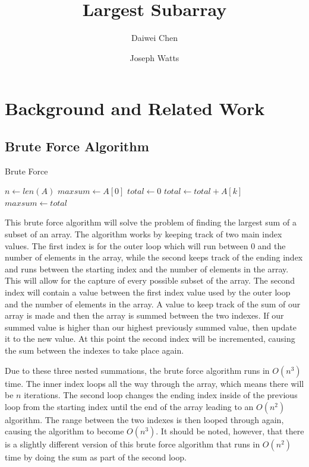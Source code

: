 \documentclass[10pt, letterpaper]{article}
\title{Largest Subarray}
\author{Daiwei Chen \and Joseph Watts}
\begin{document}
	\maketitle
	\begin{abstract}

	\end{abstract}
	\section{Background and Related Work}

	\subsection{Brute Force Algorithm}

	\begin{algorithm}
	\begin{algorithmic}
		\caption{Brute Force}\label{bruteforce}
	\State $n\gets len(A)$
	\State $maxsum\gets A[0]$
	\State $total\gets 0$
	\State $total\gets total + A[k]$
	\EndFor
	\State $maxsum\gets total$
	\EndIf
	\EndFor
	\EndFor
	\EndFunction
	\end{algorithmic}
	\end{algorithm}

	This brute force algorithm will solve the problem of finding the largest sum of a subset of an array.
	The algorithm works by keeping track of two main index values.
	The first index is for the outer loop which will run between 0 and the number of elements in the array, while the second keeps track of the ending index and runs between the starting index and the number of elements in the array.
	This will allow for the capture of every possible subset of the array.
	The second index will contain a value between the first index value used by the outer loop and the number of elements in the array.
	A value to keep track of the sum of our array is made and then the array is summed between the two indexes.
	If our summed value is higher than our highest previously summed value, then update it to the new value.
	At this point the second index will be incremented, causing the sum between the indexes to take place again.


	Due to these three nested summations, the brute force algorithm runs in $O(n^3)$ time.
	The inner index loops all the way through the array, which means there will be $n$ iterations.
	The second loop changes the ending index inside of the previous loop from the starting index until the end of the array leading to an $O(n^2)$ algorithm.
	The range between the two indexes is then looped through again, causing the algorithm to become $O(n^3)$.
	It should be noted, however, that there is a slightly different version of this brute force algorithm that runs in $O(n^2)$ time by doing the sum as part of the second loop.
	
\end{document}
